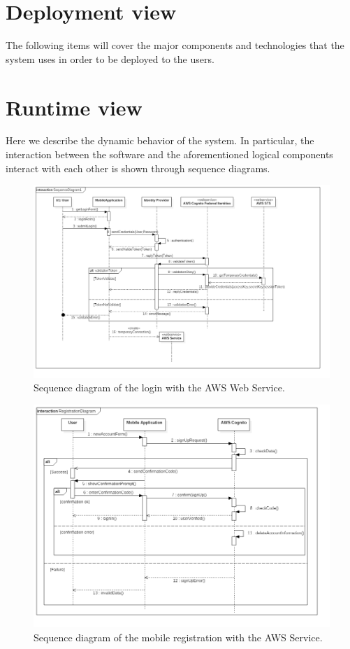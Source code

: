 \section{Deployment view}
\label{sec:depl_view}
The following items will cover the major components and technologies that the system uses in order to be deployed to the users.



\section{Runtime view}
\label{sec:runtime_view}
Here we describe the dynamic behavior of the system. In particular, the interaction between the software and the aforementioned logical components interact with each other is shown through sequence diagrams.

\begin{figure}
	\centering
	\includegraphics[width=6in]{./diagrams/SequenceDiagramLogin.png}
	\caption{Sequence diagram of the login with the AWS Web Service.}
	\label{fig:seqLogin}
\end{figure}


\begin{figure}
	\centering
	\includegraphics[width=6in]{./diagrams/RegistrationDiagram.png}
	\caption{Sequence diagram of the mobile registration with the AWS Service.}
	\label{fig:seqRegistration}
\end{figure}

